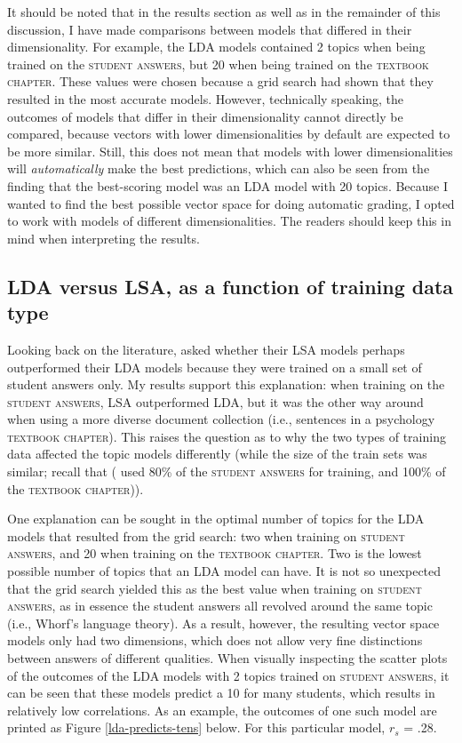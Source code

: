 \documentclass[a4paper,10pt,twoside]{article}
\begin{document}
It should be noted that in the results section as well as in the remainder of this discussion, I have made comparisons between models that differed in their dimensionality. For example, the LDA models contained 2 topics when being trained on the \textsc{student answers}, but 20 when being trained on the \textsc{textbook chapter}. These values were chosen because a grid search had shown that they resulted in the most accurate models. However, technically speaking, the outcomes of models that differ in their dimensionality cannot directly be compared, because vectors with lower dimensionalities by default are expected to be more similar. Still, this does not mean that models with lower dimensionalities will \textit{automatically} make the best predictions, which can also be seen from the finding that the best-scoring model was an LDA model with 20 topics. Because I wanted to find the best possible vector space for doing automatic grading, I opted to work with models of different dimensionalities. The readers should keep this in mind when interpreting the results.

\subsection{LDA versus LSA, as a function of training data type}
Looking back on the literature,  asked whether their LSA models perhaps outperformed their LDA models because they were trained on a small set of student answers only. My results support this explanation: when training on the \textsc{student answers}, LSA outperformed LDA, but it was the other way around when using a more diverse document collection (i.e., sentences in a psychology \textsc{textbook chapter}). This raises the question as to why the two types of training data affected the topic models differently (while the size of the train sets was similar; recall that ( used 80\% of the \textsc{student answers} for training, and 100\% of the \textsc{textbook chapter})).

One explanation can be sought in the optimal number of topics for the LDA models that resulted from the grid search: two when training on \textsc{student answers}, and 20 when training on the \textsc{textbook chapter}. Two is the lowest possible number of topics that an LDA model can have. It is not so unexpected that the grid search yielded this as the best value when training on \textsc{student answers}, as in essence the student answers all revolved around the same topic (i.e., Whorf's language theory). As a result, however, the resulting vector space models only had two dimensions, which does not allow very fine distinctions between answers of different qualities. When visually inspecting the scatter plots of the outcomes of the LDA models with 2 topics trained on \textsc{student answers}, it can be seen that these models predict a 10 for many students, which results in relatively low correlations. As an example, the outcomes of one such model are printed as Figure \ref{lda-predicts-tens} below. For this particular model, $\textit{r}_s$ = .28.
\end{document}
